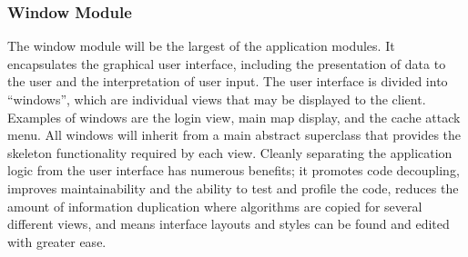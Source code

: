 \subsubsection{Window Module}
The window module will be the largest of the application modules. It encapsulates the graphical user interface, including the presentation of data to the user and the interpretation of user input. The user interface is divided into ``windows'', which are individual views that may be displayed to the client. Examples of windows are the login view, main map display, and the cache attack menu. All windows will inherit from a main abstract superclass that provides the skeleton functionality required by each view. Cleanly separating the application logic from the user interface has numerous benefits; it promotes code decoupling, improves maintainability and the ability to test and profile the code, reduces the amount of information duplication where algorithms are copied for several different views, and means interface layouts and styles can be found and edited with greater ease.


